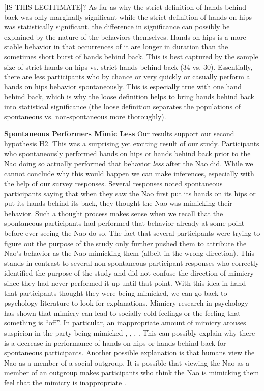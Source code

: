 \documentclass{acm_proc_article-sp}
\begin{document}
[IS THIS LEGITIMATE]? As far as why the strict definition of hands behind back was only marginally significant while the strict definition of hands on hips was statistically significant, the difference in significance can possibly be explained by the nature of the behaviors themselves. Hands on hips is a more stable behavior in that occurrences of it are longer in duration than the sometimes short burst of hands behind back. This is best captured by the sample size of strict hands on hips vs. strict hands behind back (34 vs. 30). Essentially, there are less participants who by chance or very quickly or casually perform a hands on hips behavior spontaneously. This is especially true with one hand behind back, which is why the loose definition helps to bring hands behind back into statistical significance (the loose definition separates the populations of spontaneous vs. non-spontaneous more thoroughly).

\textbf{Spontaneous Performers Mimic Less} Our results support our second hypothesis H2. This was a surprising yet exciting result of our study. Participants who spontaneously performed hands on hips or hands behind back prior to the Nao doing so actually performed that behavior \textit{less} after the Nao did. While we cannot conclude why this would happen we can make inferences, especially with the help of our survey responses. Several responses noted spontaneous participants saying that when they saw the Nao first put its hands on its hips or put its hands behind its back, they thought the Nao was mimicking their behavior. Such a thought process makes sense when we recall that the spontaneous participants had performed that behavior already at some point before ever seeing the Nao do so. The fact that several participants were trying to figure out the purpose of the study only further pushed them to attribute the Nao's behavior as the Nao mimicking them (albeit in the wrong direction). This stands in contrast to several non-spontaneous participant responses who correctly identified the purpose of the study and did not confuse the direction of mimicry since they had never performed it up until that point. With this idea in hand that participants thought they were being mimicked, we can go back to psychology literature to look for explanations. Mimicry research in psychology has shown that mimicry can lead to socially cold feelings or the feeling that something is ``off''. In particular, an inappropriate amount of mimicry arouses suspicion in the party being mimicked \cite{bargh2012substitutability}, \cite{leander2012you}, \cite{stel2010mimicking}, \cite{zhong2008cold}. This can possibly explain why there is a decrease in performance of hands on hips or hands behind back for spontaneous participants. Another possible explanation is that humans view the Nao as a member of a social outgroup. It is possible that viewing the Nao as a member of an outgroup makes participants who think the Nao is mimicking them feel that the mimicry is inappropriate \cite{kavanagh2011s}.%
\end{document}
